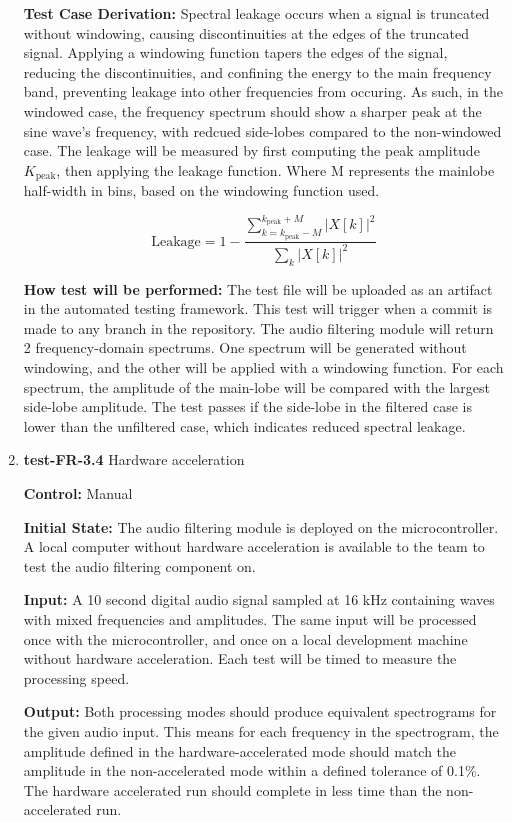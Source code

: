 \documentclass[12pt, titlepage]{article}
\begin{document}
\begin{enumerate}
\textbf{Test Case Derivation:} 
Spectral leakage occurs when a signal is truncated without windowing, causing 
discontinuities at the edges of the truncated signal. Applying a windowing 
function tapers the edges of the signal, reducing the discontinuities, and 
confining the energy to the main frequency band, preventing leakage into other 
frequencies from occuring. As such, in the windowed case, the frequency 
spectrum should show a sharper peak at the sine wave's frequency, with redcued 
side-lobes compared to the non-windowed case. The leakage will be measured by 
first computing the peak amplitude $K_{\text{peak}}$, then applying the 
leakage function. Where M represents the mainlobe half-width in bins, based on 
the windowing function used.  

\[
\text{Leakage} = 1 - \frac{\displaystyle\sum_{k = k_{\text{peak}} - M}^{k_{\text{peak}} + M} |X[k]|^2}{\displaystyle\sum_{k} |X[k]|^2}
\]

\textbf{How test will be performed:}
The test file will be uploaded as an artifact in the automated testing 
framework. This test will trigger when a commit is made to any branch in the 
repository. The audio filtering module will return 2 frequency-domain spectrums.
 One spectrum will be generated without windowing, and the other will be applied
 with a windowing function. For each spectrum, the amplitude of the main-lobe 
will be compared with the largest side-lobe amplitude. The test passes if the 
side-lobe in the filtered case is lower than the unfiltered case, which 
indicates reduced spectral leakage. 

\item{\textbf{test-FR-3.4} Hardware acceleration\\}

\textbf{Control:} Manual
					
\textbf{Initial State:} 
The audio filtering module is deployed on the microcontroller. A local computer 
without hardware acceleration is available to the team to test the audio 
filtering component on.
					
\textbf{Input:}
A 10 second digital audio signal sampled at 16 kHz containing waves with 
mixed frequencies and amplitudes. The same input will be processed once with 
the microcontroller, and once on a local development machine without hardware 
acceleration. Each test will be timed to measure the processing speed. 
					
\textbf{Output:}
Both processing modes should produce equivalent spectrograms for the given 
audio input. This means for each frequency in the spectrogram, the amplitude 
defined in the hardware-accelerated mode should match the amplitude in the 
non-accelerated mode within a defined tolerance of 0.1\%. The hardware 
accelerated run should complete in less time than the non-accelerated run.


\end{enumerate}
\end{document}

